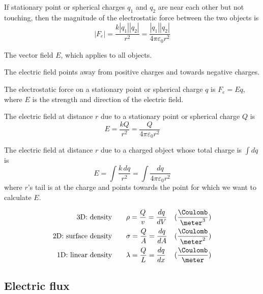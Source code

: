 \begin{namedlaw}
  If stationary point or spherical charges $q_1$ and $q_2$ are near each other but not touching, then the magnitude of the electrostatic force between the two objects is
  \[
    |F_e| = \frac{k |q_1| |q_2|}{r^2} = \frac{|q_1| |q_2|}{4 \pi \varepsilon_0 r^2}
  \]
\end{namedlaw}

\begin{definition}
  The vector field $E$, which applies to all objects.

  The electric field points away from positive charges and towards negative charges.
\end{definition}

\begin{law}
  The electrostatic force on a stationary point or spherical charge $q$ is $F_e = Eq$, where $E$ is the strength and direction of the electric field.
\end{law}

\begin{law}
  The electric field at distance $r$ due to a stationary point or spherical charge $Q$ is
  \[
    E = \frac{kQ}{r^2} = \frac{Q}{4\pi\varepsilon_0 r^2}
  \]

  The electric field at distance $r$ due to a charged object whose total charge is $\int dq$ is
  \[
    E = \int \frac{k \,dq}{r^2} = \int \frac{dq}{4 \pi \varepsilon_0 r^2}
  \]
  where $r$'s tail is at the charge and points towards the point for which we want to calculate $E$.
\end{law}

\begin{definition}
  \begin{align*}
    \text{3D: density} \qquad & \rho = \frac{Q}{v} = \frac{dq}{dV} & (\frac{\Coulomb}{\meter^3}) \\
    \text{2D: surface density} \qquad & \sigma = \frac{Q}{A} = \frac{dq}{dA} & (\frac{\Coulomb}{\meter^2}) \\
    \text{1D: linear density} \qquad & \lambda = \frac{Q}{L} = \frac{dq}{dx} & (\frac{\Coulomb}{\meter}) \\
  \end{align*}
\end{definition}

\subsection{Electric flux}


